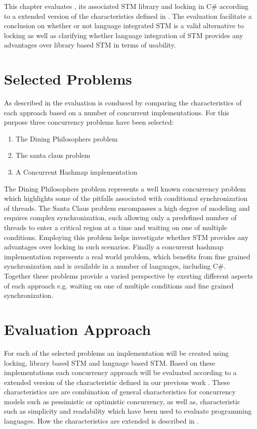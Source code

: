 \makeatletter {}\makeatother
{}
This chapter evaluates \stmname, its associated \ac{STM} library and locking in C\# according to a extended version of the characteristics defined in \cite[p. 15-21]{dpt907e14trending}. The evaluation facilitate a conclusion on whether or not language integrated \ac{STM} is a valid alternative to locking as well as clarifying whether language integration of \ac{STM} provides any advantages over library based \ac{STM} in terms of usability.
\label{chap:evaluation}
\section{Selected Problems}
As described in  the evaluation is conduced by comparing the characteristics of each approach based on a number of concurrent implementations. For this purpose three concurrency problems have been selected:
\begin{enumerate}
\item The Dining Philosophers problem\cite[p. 673]{hoare1978communicating}
\item The santa claus problem\cite{trono1994new}
\item A Concurrent Hashmap implementation\cite[p. 253]{cormen2009introduction}
\end{enumerate}
The Dining Philosophers problem represents a well known concurrency problem which highlights some of the pitfalls associated with conditional synchronization of threads. The Santa Claus problem encompasses a high degree of modeling and requires complex synchronization, such allowing only a predefined number of threads to enter a critical region at a time and waiting on one of multiple conditions. Employing this problem helps investigate whether \ac{STM} provides any advantages over locking in such scenarios. Finally a concurrent hashmap implementation represents a real world problem, which benefits from fine grained synchronization and is available in a number of languages, including C\#. Together these problems provide a varied perspective by exerting different aspects of each approach e.g. waiting on one of multiple conditions and fine grained synchronization.

\section{Evaluation Approach}
For each of the selected problems an implementation will be created using locking, library based \ac{STM} and language based \ac{STM}. Based on these implementations each concurrency approach will be evaluated according to a extended version of the characteristic defined in our previous work 
\cite[p. 15-21]{dpt907e14trending}. These characteristics are are combination of general characteristics for concurrency models such as pessimistic or optimistic concurrency, as well as, characteristic such as simplicity and readability which have been used to evaluate programming languages\cite[p. 7]{sebestaProLang}. How the characteristics are extended is described in .

